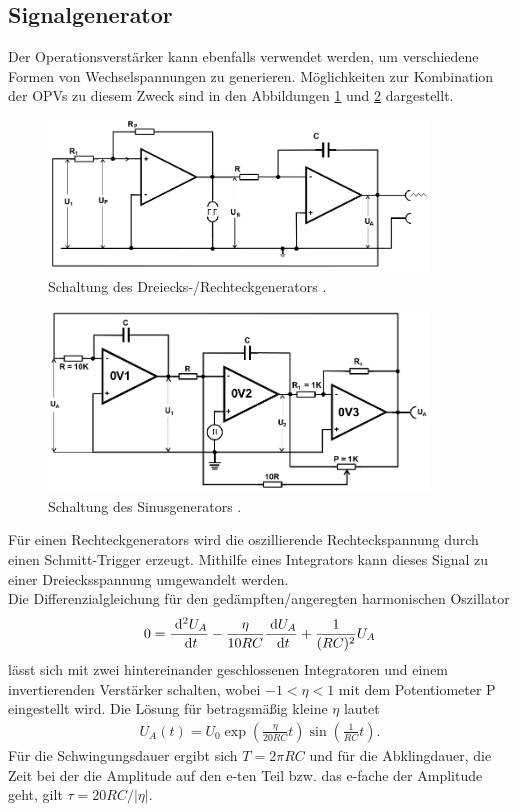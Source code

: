 \subsection{Signalgenerator}
Der Operationsverstärker kann ebenfalls verwendet werden, um verschiedene Formen
von Wechselspannungen zu generieren. Möglichkeiten zur Kombination der OPVs 
zu diesem Zweck sind in den Abbildungen \ref{pic:dreiRect}
und \ref{pic:sinus} dargestellt.
\begin{figure}[t]
 \includegraphics[width = 0.9\textwidth]{../pics/DreiRect.png}
 \caption{Schaltung des Dreiecks-/Rechteckgenerators \cite{Anl}.}
 \label{pic:dreiRect}
\end{figure}
\begin{figure}[t]
 \includegraphics[width = 0.9\textwidth]{../pics/sinus.png}
 \caption{Schaltung des Sinusgenerators \cite{Anl}.}
 \label{pic:sinus}
\end{figure}
Für einen Rechteckgenerators wird die oszillierende Rechteckspannung durch einen
Schmitt-Trigger erzeugt. Mithilfe eines Integrators kann dieses Signal 
zu einer Dreiecksspannung umgewandelt werden.\\
\noindent Die Differenzialgleichung für den gedämpften/angeregten
harmonischen Oszillator
\begin{align}
 0 = \frac{\; \mathrm{d}^2 U_A}{\; \mathrm{d} t}- \frac{\eta}{10 RC} \frac{\; \mathrm{d} U_A}{\; \mathrm{d} t} + \frac{1}{(RC)^2}U_A
\end{align}
lässt sich mit zwei hintereinander geschlossenen Integratoren und einem invertierenden
Verstärker schalten, wobei $-1<\eta<1$ mit dem Potentiometer P eingestellt wird. Die Lösung
für betragsmäßig kleine $\eta$ lautet
\begin{align}
 U_A(t) = U_0 \exp\left(\frac{\eta}{20RC}t\right) \sin\left(\frac{1}{RC}t\right).
\end{align}
Für die Schwingungsdauer ergibt sich $T=2\pi RC$ und für die Abklingdauer,
die Zeit bei der die Amplitude auf den e-ten Teil bzw. das e-fache der Amplitude geht,
gilt $\tau = 20RC/|\eta|$.

